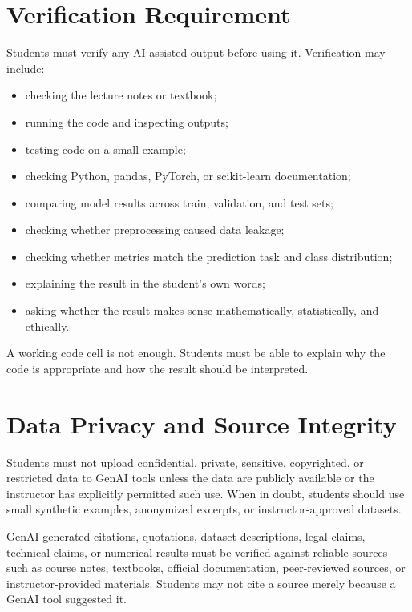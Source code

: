 \documentclass[11pt]{article}
\begin{document}
\section{Verification Requirement}

Students must verify any AI-assisted output before using it. Verification may include:

\begin{itemize}
    \item checking the lecture notes or textbook;
    \item running the code and inspecting outputs;
    \item testing code on a small example;
    \item checking Python, pandas, PyTorch, or scikit-learn documentation;
    \item comparing model results across train, validation, and test sets;
    \item checking whether preprocessing caused data leakage;
    \item checking whether metrics match the prediction task and class distribution;
    \item explaining the result in the student's own words;
    \item asking whether the result makes sense mathematically, statistically, and ethically.
\end{itemize}

A working code cell is not enough. Students must be able to explain why the code is appropriate and how the result should be interpreted.

\section{Data Privacy and Source Integrity}

Students must not upload confidential, private, sensitive, copyrighted, or restricted data to GenAI tools unless the data are publicly available or the instructor has explicitly permitted such use. When in doubt, students should use small synthetic examples, anonymized excerpts, or instructor-approved datasets.

GenAI-generated citations, quotations, dataset descriptions, legal claims, technical claims, or numerical results must be verified against reliable sources such as course notes, textbooks, official documentation, peer-reviewed sources, or instructor-provided materials. Students may not cite a source merely because a GenAI tool suggested it.
\end{document}
